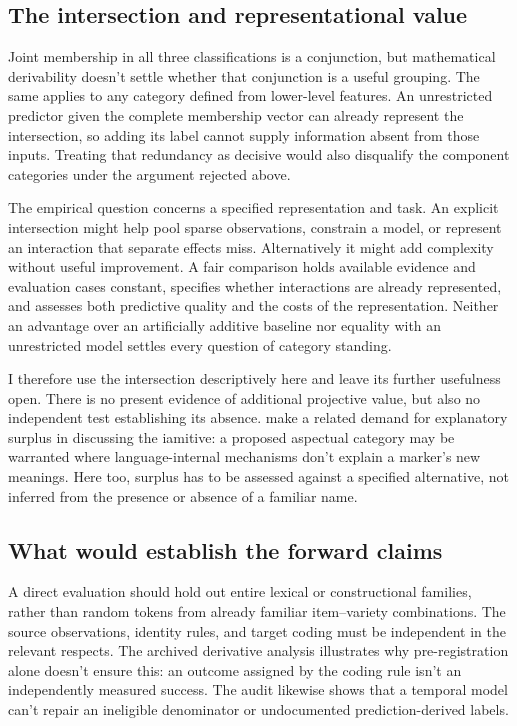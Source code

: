 \documentclass[12pt]{article}
\begin{document}
\subsection{The intersection and representational value}

Joint membership in all three classifications is a conjunction, but mathematical derivability doesn't settle whether that conjunction is a useful grouping. The same applies to any category defined from lower-level features. An unrestricted predictor given the complete membership vector can already represent the intersection, so adding its label cannot supply information absent from those inputs. Treating that redundancy as decisive would also disqualify the component categories under the argument rejected above.

The empirical question concerns a specified representation and task. An explicit intersection might help pool sparse observations, constrain a model, or represent an interaction that separate effects miss. Alternatively it might add complexity without useful improvement. A fair comparison holds available evidence and evaluation cases constant, specifies whether interactions are already represented, and assesses both predictive quality and the costs of the representation. Neither an advantage over an artificially additive baseline nor equality with an unrestricted model settles every question of category standing.

I therefore use the intersection descriptively here and leave its further usefulness open. There is no present evidence of additional projective value, but also no independent test establishing its absence. \textcite[557]{krajinovic2025} make a related demand for explanatory surplus in discussing the iamitive: a proposed aspectual category may be warranted where language-internal mechanisms don't explain a marker's new meanings. Here too, surplus has to be assessed against a specified alternative, not inferred from the presence or absence of a familiar name.

\subsection{What would establish the forward claims}

A direct evaluation should hold out entire lexical or constructional families, rather than random tokens from already familiar item--variety combinations. The source observations, identity rules, and target coding must be independent in the relevant respects. The archived derivative analysis illustrates why pre-registration alone doesn't ensure this: an outcome assigned by the coding rule isn't an independently measured success. The  audit likewise shows that a temporal model can't repair an ineligible denominator or undocumented prediction-derived labels.
\end{document}

